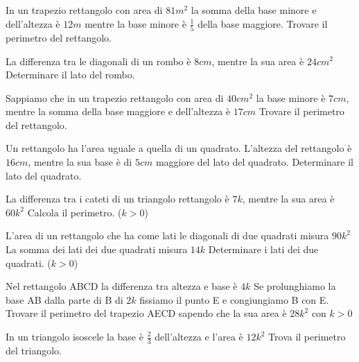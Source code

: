 \begin{multicols}{2}
\begin{esercizio}[\Ast]
 \label{ese:6.64}
In un trapezio rettangolo con area di $81\unit{m^2}$ la somma della base minore e dell'altezza è $12\unit{m}$ mentre la base minore è $\frac 1 5$ della base maggiore. Trovare il perimetro del rettangolo.
\end{esercizio}

\begin{esercizio}[\Ast]
 \label{ese:6.65}
La differenza tra le diagonali di un rombo è $8\unit{cm}$, mentre la sua area è $24\unit{{cm}^2}$ Determinare il lato del rombo.
\end{esercizio}

\begin{esercizio}[\Ast]
 \label{ese:6.66}
Sappiamo che in un trapezio rettangolo con area di $40\unit{{cm}^2}$ la base minore è $7\unit{cm}$, mentre la somma della base maggiore e dell'altezza è $17\unit{cm}$ Trovare il perimetro del rettangolo.
\end{esercizio}

\begin{esercizio}[\Ast]
 \label{ese:6.67}
Un rettangolo ha l'area uguale a quella di un quadrato. L'altezza del rettangolo è $16\unit{cm}$, mentre la sua base è di $5\unit{cm}$ maggiore del lato del quadrato. Determinare il lato del quadrato.
\end{esercizio}

\begin{esercizio}[\Ast]
 \label{ese:6.68}
La differenza tra i cateti di un triangolo rettangolo è $7k$, mentre la sua area è $60 k^2$ Calcola il perimetro. ($k>0$)
\end{esercizio}

\begin{esercizio}[\Ast]
 \label{ese:6.69}
L'area di un rettangolo che ha come lati le diagonali di due quadrati misura $90 k^2$ La somma dei lati dei due quadrati misura $14k$ Determinare i lati dei due quadrati. ($ k>0 $)
\end{esercizio}

\begin{esercizio}[\Ast]
 \label{ese:6.70}
Nel rettangolo ABCD la differenza tra altezza e base è $4k$ Se prolunghiamo la base AB dalla parte di B di $2k$ fissiamo il punto E e congiungiamo B con E. Trovare il perimetro del trapezio AECD sapendo che la sua area è $28k^2$ con $k>0$
\end{esercizio}

\begin{esercizio}[\Ast]
 \label{ese:6.71}
In un triangolo isoscele la base è $ \frac 2 3 $ dell'altezza e l'area è $12k^2$ Trova il perimetro del triangolo.
\end{esercizio}
\end{multicols}


